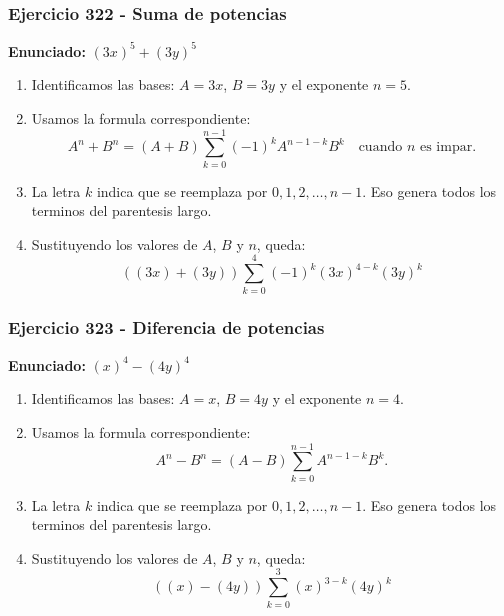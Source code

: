 \documentclass[11pt,a4paper]{article}
\begin{document}
\subsubsection*{Ejercicio 322 - Suma de potencias}
\textbf{Enunciado:} $ \left(3 x\right)^{5}+\left(3 y\right)^{5} $\par
\begin{enumerate}[leftmargin=2em]
\item Identificamos las bases: \(A=3 x\), \(B=3 y\) y el exponente \(n=5\).
\item Usamos la formula correspondiente: \[A^n+B^n=(A+B)\sum_{k=0}^{n-1}(-1)^kA^{n-1-k}B^k\quad\text{cuando }n\text{ es impar}.\]
\item La letra \(k\) indica que se reemplaza por \(0,1,2,\ldots,n-1\). Eso genera todos los terminos del parentesis largo.
\item Sustituyendo los valores de \(A\), \(B\) y \(n\), queda: \[\boxed{\left(\left(3 x\right)+\left(3 y\right)\right)\sum_{k=0}^{4}(-1)^k\left(3 x\right)^{4-k}\left(3 y\right)^k}\]
\end{enumerate}

\vspace{0.2cm}
\subsubsection*{Ejercicio 323 - Diferencia de potencias}
\textbf{Enunciado:} $ \left(x\right)^{4}-\left(4 y\right)^{4} $\par
\begin{enumerate}[leftmargin=2em]
\item Identificamos las bases: \(A=x\), \(B=4 y\) y el exponente \(n=4\).
\item Usamos la formula correspondiente: \[A^n-B^n=(A-B)\sum_{k=0}^{n-1}A^{n-1-k}B^k.\]
\item La letra \(k\) indica que se reemplaza por \(0,1,2,\ldots,n-1\). Eso genera todos los terminos del parentesis largo.
\item Sustituyendo los valores de \(A\), \(B\) y \(n\), queda: \[\boxed{\left(\left(x\right)-\left(4 y\right)\right)\sum_{k=0}^{3}\left(x\right)^{3-k}\left(4 y\right)^k}\]
\end{enumerate}

\vspace{0.2cm}
\end{document}
